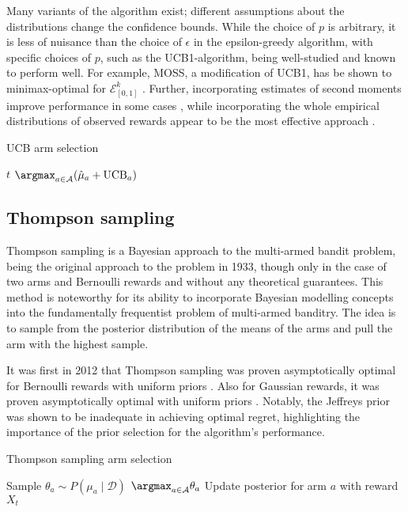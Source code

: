 Many variants of the algorithm exist; different assumptions about the distributions change the confidence bounds.
While the choice of $p$ is arbitrary, it is less of nuisance than the choice of $\epsilon$ in the epsilon-greedy algorithm, with specific choices of $p$, such as the UCB1-algorithm, being well-studied and known to perform well.
For example, MOSS, a modification of UCB1, has be shown to minimax-optimal for $\mathcal{E}_{[0,1]}^k$ \cite{audibert2009}.
Further, incorporating estimates of second moments improve performance in some cases \cite{audibert2009a}, while incorporating the whole empirical distributions of observed rewards appear to be the most effective approach \cite{maillard2011}.

\begin{algorithm}
    \caption{UCB arm selection}
    \label{alg:ucb}
    \begin{algorithmic}
        \State \Return $t$
        \Else
        \State \Return $\argmax_{a \in \mathcal{A}} (\hat{\mu}_a + \text{UCB}_a)$
        \EndIf
    \end{algorithmic}
\end{algorithm}


\subsection{Thompson sampling}
Thompson sampling is a Bayesian approach to the multi-armed bandit problem, being the original approach to the problem \cite{thompson1933} in 1933, though only in the case of two arms and Bernoulli rewards and without any theoretical guarantees.
This method is noteworthy for its ability to incorporate Bayesian modelling concepts into the fundamentally frequentist problem of multi-armed banditry.
The idea is to sample from the posterior distribution of the means of the arms and pull the arm with the highest sample.

It was first in 2012 that Thompson sampling was proven asymptotically optimal for Bernoulli rewards with uniform priors \cite{kaufmann2012}.
Also for Gaussian rewards, it was proven asymptotically optimal with uniform priors \cite{honda2014}.
Notably, the Jeffreys prior was shown to be inadequate in achieving optimal regret, highlighting the importance of the prior selection for the algorithm's performance.

\begin{algorithm}
    \caption{Thompson sampling arm selection}
    \label{alg:thompson}
    \begin{algorithmic}
        \State Sample $\theta_a \sim P(\mu_a \mid \mathcal{D})$
        \EndFor
        \State \Return $\argmax_{a \in \mathcal{A}} \theta_a$
        \State Update posterior for arm $a$ with reward $X_t$
    \end{algorithmic}
\end{algorithm}

